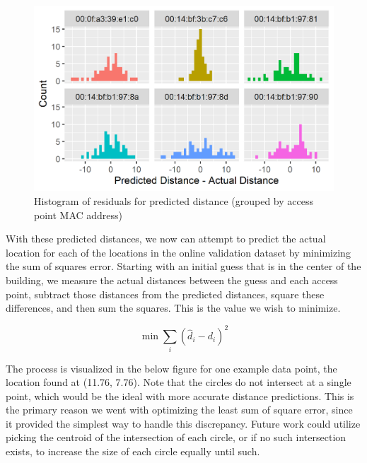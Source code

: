 \documentclass[12pt, conference]{IEEEtran}
\begin{document}
\begin{figure}[htbp]
  \centerline{\includegraphics[width=\columnwidth]{img/Distance_error_hist.png}}
  \caption{Histogram of residuals for predicted distance (grouped by access point MAC address)}
  \label{fig: K-Fold CV}
\end{figure}

With these predicted distances, we now can attempt to predict the actual location for each of the locations in the online validation dataset by minimizing the sum of squares error. Starting with an initial guess that is in the center of the building, we measure the actual distances between the guess and each access point, subtract those distances from the predicted distances, square these differences, and then sum the squares. This is the value we wish to minimize.

$$
\min \sum_{i} (\hat{d}_i - d_i)^2
$$

The process is visualized in the below figure for one example data point, the location found at (11.76, 7.76). Note that the circles do not intersect at a single point, which would be the ideal with more accurate distance predictions. This is the primary reason we went with optimizing the least sum of square error, since it provided the simplest way to handle this discrepancy. Future work could utilize picking the centroid of the intersection of each circle, or if no such intersection exists, to increase the size of each circle equally until such.
\end{document}
